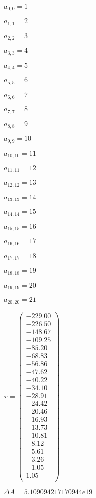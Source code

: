 \documentclass[a4paper,12pt]{article}
\begin{document}
$a _{ 0, 0 } = 1$

$a _{ 1, 1 } = 2$

$a _{ 2, 2 } = 3$

$a _{ 3, 3 } = 4$

$a _{ 4, 4 } = 5$

$a _{ 5, 5 } = 6$

$a _{ 6, 6 } = 7$

$a _{ 7, 7 } = 8$

$a _{ 8, 8 } = 9$

$a _{ 9, 9 } = 10$

$a _{ 10, 10 } = 11$

$a _{ 11, 11 } = 12$

$a _{ 12, 12 } = 13$

$a _{ 13, 13 } = 14$

$a _{ 14, 14 } = 15$

$a _{ 15, 15 } = 16$

$a _{ 16, 16 } = 17$

$a _{ 17, 17 } = 18$

$a _{ 18, 18 } = 19$

$a _{ 19, 19 } = 20$

$a _{ 20, 20 } = 21$

$\bar { x } = \begin{pmatrix}
-229.00 \\
-226.50 \\
-148.67 \\
-109.25 \\
-85.20 \\
-68.83 \\
-56.86 \\
-47.62 \\
-40.22 \\
-34.10 \\
-28.91 \\
-24.42 \\
-20.46 \\
-16.93 \\
-13.73 \\
-10.81 \\
-8.12 \\
-5.61 \\
-3.26 \\
-1.05 \\
1.05 \\
\end{pmatrix}
$

$\Delta A = 5.109094217170944e19$
\end{document}
